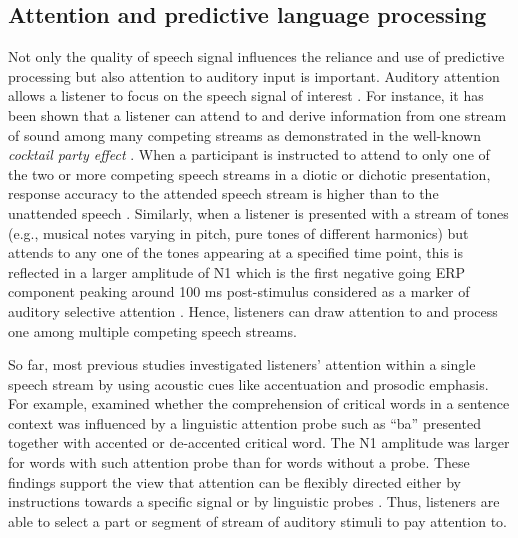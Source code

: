 \documentclass[a4paper, nobind]{templates/ociamthesis}
\begin{document}
\hypertarget{attention-and-predictive-language-processing}{%
\subsection{Attention and predictive language processing}\label{attention-and-predictive-language-processing}}

Not only the quality of speech signal influences the reliance and use of predictive processing but also attention to auditory input is important.
Auditory attention allows a listener to focus on the speech signal of interest \autocites[for reviews, see][]{Fritz2007}[see also][]{Lange2013}.
For instance, it has been shown that a listener can attend to and derive information from one stream of sound among many competing streams as demonstrated in the well-known \emph{cocktail party effect} \autocite{Cherry1953,Hafter2007}.
When a participant is instructed to attend to only one of the two or more competing speech streams in a diotic or dichotic presentation, response accuracy to the attended speech stream is higher than to the unattended speech \autocite[e.g.,][]{Toth2020}.
Similarly, when a listener is presented with a stream of tones (e.g., musical notes varying in pitch, pure tones of different harmonics) but attends to any one of the tones appearing at a specified time point, this is reflected in a larger amplitude of N1 \autocites[e.g.,][]{Lange2010}[see also][]{Sanders2008}
which is the first negative going ERP component peaking around 100 ms post-stimulus considered as a marker of auditory selective attention \autocite{Naatanen1987,Thorton2007}.
Hence, listeners can draw attention to and process one among multiple competing speech streams.

So far, most previous studies investigated listeners' attention within a single speech stream by using acoustic cues like accentuation and prosodic emphasis.
For example, \textcite{Li2014} examined whether the comprehension of critical words in a sentence context was influenced by a linguistic attention probe such as ``ba'' presented together with accented or de-accented critical word.
The N1 amplitude was larger for words with such attention probe than for words without a probe.
These findings support the view that attention can be flexibly directed either by instructions towards a specific signal or by linguistic probes \autocite[see also, \textcite{Brunelliere2019}]{Li2017}.
Thus, listeners are able to select a part or segment of stream of auditory stimuli to pay attention to.
\end{document}
